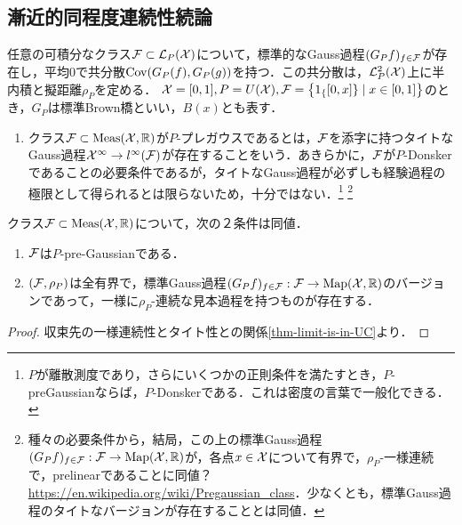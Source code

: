 \documentclass[uplatex,dvipdfmx]{jsreport}
\begin{document}
\subsection{漸近的同程度連続性続論}

\begin{tcolorbox}[colframe=ForestGreen, colback=ForestGreen!10!white,breakable,colbacktitle=ForestGreen!40!white,coltitle=black,fonttitle=\bfseries\sffamily,
title=]
    任意の可積分なクラス$\mathcal{F}\subset\mathcal{L}_P(\mathcal{X})$について，標準的なGauss過程$(G_Pf)_{f\in\mathcal{F}}$が存在し，平均$0$で共分散$\mathrm{Cov}(G_P(f),G_P(g))$を持つ．この共分散は，$\mathcal{L}^2_P(\mathcal{X})$上に半内積と擬距離$\rho_P$を定める．
    $\mathcal{X}=[0,1],P=U(\mathcal{X}),\mathcal{F}=\left\{1_\{[0,x]\}\mid x\in[0,1]\right\}$のとき，$G_P$は標準Brown橋といい，$B(x)$とも表す．
\end{tcolorbox}

\begin{definition}\mbox{}
    \begin{enumerate}
        \item クラス$\mathcal{F}\subset\mathrm{Meas}(\mathcal{X},\mathbb{R})$が$P$-プレガウスであるとは，$\mathcal{F}$を添字に持つタイトなGauss過程$\mathcal{X}^\infty\to l^\infty(\mathcal{F})$が存在することをいう．あきらかに，$\mathcal{F}$が$P$-Donskerであることの必要条件であるが，タイトなGauss過程が必ずしも経験過程の極限として得られるとは限らないため，十分ではない．\footnote{$P$が離散測度であり，さらにいくつかの正則条件を満たすとき，$P$-preGaussianならば，$P$-Donskerである．これは密度の言葉で一般化できる．}
        \footnote{種々の必要条件から，結局，この上の標準Gauss過程$(G_Pf)_{f\in\mathcal{F}}:\mathcal{F}\to\mathrm{Map}(\mathcal{X},\mathbb{R})$が，各点$x\in\mathcal{X}$について有界で，$\rho_P$-一様連続で，prelinearであることに同値？\url{https://en.wikipedia.org/wiki/Pregaussian_class}．少なくとも，標準Gauss過程のタイトなバージョンが存在することとは同値\cite{van der Vaart and Wellner}．}
    \end{enumerate}
\end{definition}

\begin{lemma}
    クラス$\mathcal{F}\subset\mathrm{Meas}(\mathcal{X},\mathbb{R})$について，次の２条件は同値．
    \begin{enumerate}
        \item $\mathcal{F}$は$P$-pre-Gaussianである．
        \item $(\mathcal{F},\rho_P)$は全有界で，標準Gauss過程$(G_Pf)_{f\in\mathcal{F}}:\mathcal{F}\to\mathrm{Map}(\mathcal{X},\mathbb{R})$のバージョンであって，一様に$\rho_P$-連続な見本過程を持つものが存在する．
    \end{enumerate}
\end{lemma}
\begin{proof}
    収束先の一様連続性とタイト性との関係\ref{thm-limit-is-in-UC}より．
\end{proof}
\end{document}
